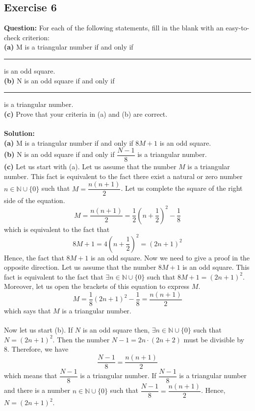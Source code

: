 \documentclass{article}
\begin{document}
\subsection{Exercise 6}
\textbf{Question:} For each of the following statements, fill in the blank with an easy-to-check criterion:\\
\textbf{(a)} M is a triangular number if and only if \rule{1cm}{0.15mm} is an odd square.\\
\textbf{(b)} N is an odd square if and only if \rule{1cm}{0.15mm} is a triangular number.\\
\textbf{(c)} Prove that your criteria in (a) and (b) are correct.\\
\\\textbf{Solution:}\\
\textbf{(a)} M is a triangular number if and only if $8M+1$ is an odd square.\\
\textbf{(b)} N is an odd square if and only if $\dfrac{N-1}{8}$ is a triangular number.\\
\textbf{(c)} Let us start with (a). Let us assume that the number $M$ is a triangular number. This fact is equivalent to the fact there exist a natural or zero number $n\in \mathbb{N}\cup \{0\}$ such that $M = \dfrac{n(n+1)}{2}$. Let us complete the square of the right side of the equation.
\begin{equation*}
M = \dfrac{n(n+1)}{2} = \dfrac{1}{2}(n+\dfrac{1}{2})^2-\dfrac{1}{8}
\end{equation*}
which is equivalent to the fact that
\begin{equation*}
8M+1=4(n+\dfrac{1}{2})^2=(2n+1)^2
\end{equation*}
Hence, the fact that $8M+1$ is an odd square. Now we need to give a proof in the opposite direction. Let us assume that the number $8M+1$ is an odd square. This fact is equivalent to the fact that $\exists n\in \mathbb{N}\cup\{0\}$ such that $8M+1 = (2n+1)^2$. Moreover, let us open the brackets of this equation to express $M$.
\begin{equation*}
M = \dfrac{1}{8}(2n+1)^2-\dfrac{1}{8}=\dfrac{n(n+1)}{2}
\end{equation*}
which says that $M$ is a triangular number.\\
\\ Now let us start (b). If $N$ is an odd square then, $\exists n\in \mathbb{N}\cup \{0\}$ such that $N = (2n+1)^2$. Then the number $N - 1 = 2n\cdot (2n+2)$ must be divisible by 8. Therefore, we have
\begin{equation*}
\dfrac{N-1}{8}=\dfrac{n(n+1)}{2}
\end{equation*}
which means that $\dfrac{N-1}{8}$ is a triangular number. If $\dfrac{N-1}{8}$ is a triangular number and there is a number $n\in \mathbb{N}\cup\{0\}$ such that $\dfrac{N-1}{8} = \dfrac{n(n+1)}{2}$. Hence, $N = (2n+1)^2$.
\end{document}
